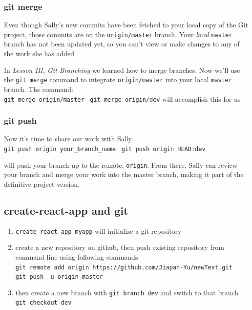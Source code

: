 \documentclass[a4paper, 12pt]{article}
\begin{document}
\subsubsection{git merge}
Even though Sally's new commits have been fetched to your local copy of the Git project, those commits are on the \verb|origin/master| branch. Your \textit{local} \verb|master| branch has not been updated yet, so you can't view or make changes to any of the work she has added

In \textit{Lesson III, Git Branching} we learned how to merge branches. Now we'll use the \verb|git merge| command to integrate \verb|origin/master| into your local \verb|master| branch. The command:\\
\verb|git merge origin/master| \textbar~\verb|git merge origin/dev| will accomplish this for us

\subsubsection{git push}
Now it's time to share our work with Sally.\\
\verb|git push origin your_branch_name| \textbar~\verb|git push origin HEAD:dev|

will push your branch up to the remote, \verb|origin|. From there, Sally can review your branch and merge your work into the master branch, making it part of the definitive project version.



\subsection{create-react-app and git}
\begin{enumerate}
\item \verb|create-react-app myapp| will initialize a git repository

\item create a new repository on github, then push existing repository from command line using following commands\\
\verb|git remote add origin https://github.com/Jiapan-Yu/newTest.git|\\
\verb|git push -u origin master|

\item then create a new branch with \verb|git branch dev| and switch to that branch\\ \verb|git checkout dev|

\end{enumerate}
\end{document}
